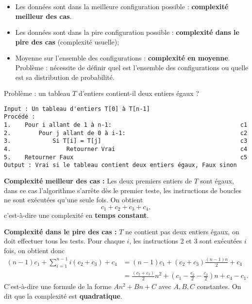 \documentclass{../cours}
\begin{document}
\begin{itemize}
\item Les données sont dans la meilleure configuration possible : \textbf{complexité meilleur des cas}.
\item Les données sont dans la pire configuration possible : \textbf{complexité dans le pire des cas} (complexité usuelle);
\item Moyenne sur l'ensemble des configurations : \textbf{complexité en moyenne}. Problème : nécessite de définir quel est l'ensemble des configurations ou quelle est sa distribution de probabilité. 
\end{itemize}

\begin{Example}
Problème : un tableau $T$ d'entiers contient-il deux entiers égaux ? 
\begin{lstlisting}
Input : Un tableau d'entiers T[0] à T[n-1]
Procédé :
1.    Pour i allant de 1 à n-1:                                     c1
2.        Pour j allant de 0 à i-1:                                 c2
3.            Si T[i] = T[j]                                        c3
4.                Retourner Vrai                                    c4
5.    Retourner Faux                                                c5
Output : Vrai si le tableau contient deux entiers égaux, Faux sinon
\end{lstlisting}

\textbf{Complexité meilleur des cas :} Les deux premiers entiers de $T$ sont égaux, dans ce cas l'algorithme s'arrête dès le premier teste, les instructions de boucles ne sont exécutées qu'une seule fois. On obtient 
\begin{equation}
c_1 + c_2 + c_3 + c_4,
\end{equation}
c'est-à-dire une complexité en \textbf{temps constant}.

\textbf{Complexité dans le pire des cas :} $T$ ne contient pas deux entiers égaux, on doit effectuer tous les tests. Pour chaque $i$, les instructions 2 et 3 sont exécutées 
$i$ fois, on obtient donc 
\begin{align}
(n-1) c_1 + \sum_{i = 1}^{n-1} i(c_2 + c_3) + c_4 &= (n-1) c_1 + (c_2 + c_3) \frac{(n-1)n}{2} + c_4 \\
&= \frac{(c_2 + c_3)}{2}n^2 + (c_1 - \frac{c_2}{2} - \frac{c_3}{2})n + c_4 - c_1.
\end{align}
C'est-à-dire une formule de la forme $A n^2 + Bn + C$ avec $A,B,C$ constantes. On dit que la complexité est \textbf{quadratique}.


\end{Example}
\end{document}
